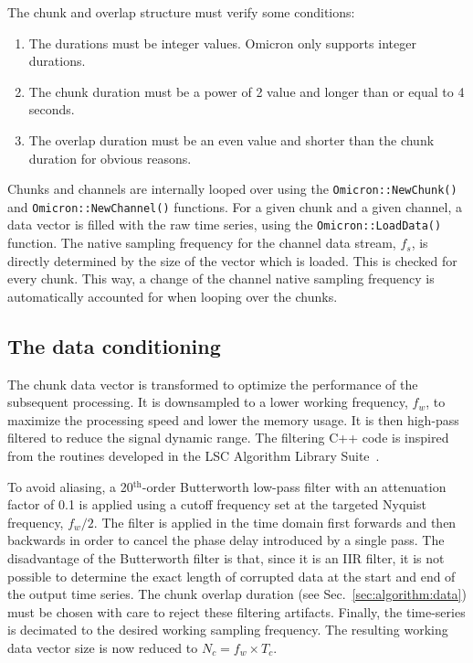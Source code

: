 The chunk and overlap structure must verify some conditions:
\begin{enumerate}
\item The durations must be integer values. Omicron only supports integer durations.
\item The chunk duration must be a power of 2 value and longer than or equal to 4 seconds.
\item The overlap duration must be an even value and shorter than the chunk duration for obvious reasons.
\end{enumerate}

Chunks and channels are internally looped over using the \texttt{Omicron::NewChunk()} and \texttt{Omicron::NewChannel()} functions. For a given chunk and a given channel, a data vector is filled with the raw time series, using the \texttt{Omicron::LoadData()} function. The native sampling frequency for the channel data stream, $f_s$, is directly determined by the size of the vector which is loaded. This is checked for every chunk. This way, a change of the channel native sampling frequency is automatically accounted for when looping over the chunks.


\subsection{The data conditioning} \label{sec:algorithm:conditioning}
The chunk data vector is transformed to optimize the performance of the subsequent processing. It is downsampled to a lower working frequency, $f_w$, to maximize the processing speed and lower the memory usage. It is then high-pass filtered to reduce the signal dynamic range. The filtering C++ code is inspired from the routines developed in the LSC Algorithm Library Suite~\cite{LALSUITE}.

To avoid aliasing, a 20$^{\mathrm{th}}$-order Butterworth low-pass filter with an attenuation factor of 0.1 is applied using a cutoff frequency set at the targeted Nyquist frequency, $f_w/2$. The filter is applied in the time domain first forwards and then backwards in order to cancel the phase delay introduced by a single pass. The disadvantage of the Butterworth filter is that, since it is an IIR filter, it is not possible to determine the exact length of corrupted data at the start and end of the output time series. The chunk overlap duration (see Sec.~\ref{sec:algorithm:data}) must be chosen with care to reject these filtering artifacts. Finally, the time-series is decimated to the desired working sampling frequency. The resulting working data vector size is now reduced to $N_c=f_w \times T_c$.

